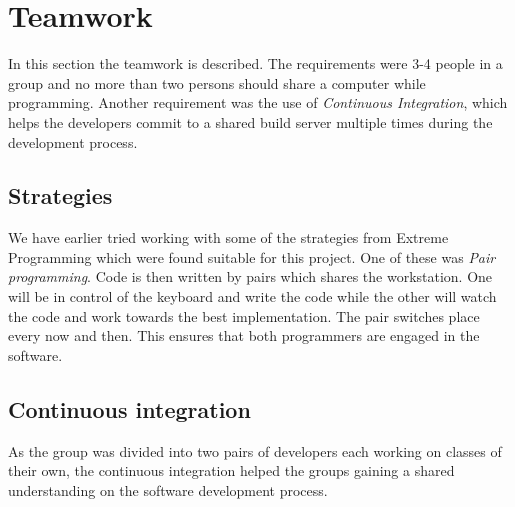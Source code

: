\section{Teamwork}
In this section the teamwork is described. The requirements were 3-4 people in a group and no more than two persons should share a computer while programming. Another requirement was the use of \emph{Continuous Integration}, which helps the developers commit to a shared build server multiple times during the development process.

\subsection{Strategies}
We have earlier tried working with some of the strategies from Extreme Programming which were found suitable for this project. One of these was \emph{Pair programming}. Code is then written by pairs which shares the workstation. One will be in control of the keyboard and write the code while the other will watch the code and work towards the best implementation. The pair switches place every now and then. This ensures that both programmers are engaged in the software.

\subsection{Continuous integration}
As the group was divided into two pairs of developers each working on classes of their own, the continuous integration helped the groups gaining a shared understanding on the software development process.